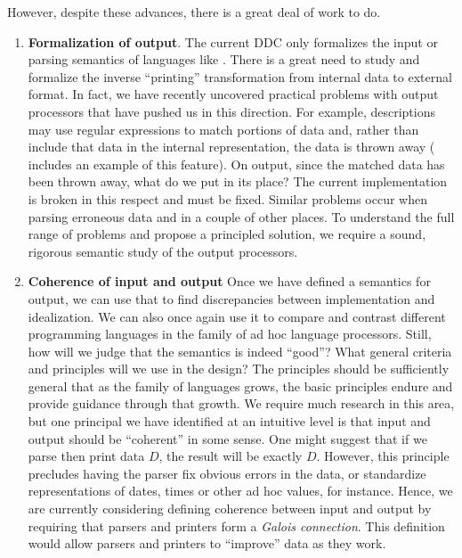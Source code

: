 However, despite these advances, there is a great deal of work to do.

\begin{enumerate}
\item {\bf Formalization of output}.  The current DDC only formalizes the
input or parsing semantics of languages like \pads.  There is
a great need to study and formalize the inverse ``printing'' transformation 
from internal data to external format.  In fact, we have recently
uncovered practical problems with output processors that have pushed us in 
this direction. For example, \pads{} descriptions may use regular expressions
to match portions of data and, rather than include that data in the
internal representation, the data is thrown away (
includes an example of this feature).  On output, since the matched
data has been thrown away, what do we put in its place?  The 
current implementation is broken in this respect and must be fixed.
Similar problems occur when parsing erroneous data and in a couple of other
places.  To understand the full range of problems and propose
a principled solution, we require a sound, rigorous semantic study
of the output processors.

\item {\bf Coherence of input and output}  Once we have defined a semantics
for output, we can use that to find discrepancies between implementation
and idealization.  We can also once again
use it to compare and contrast different programming languages
in the family of ad hoc language processors.  Still, 
how will we judge that the semantics is indeed ``good''?
What general criteria and principles will we use in the design?  The
principles should be sufficiently general that as the family of languages
grows, the basic principles endure and provide guidance through that 
growth.  We require much research in this area, but one principal
we have identified at an intuitive level is that input and output
should be ``coherent'' in some sense.  One might suggest that 
if we parse then print data $D$, the result will be exactly $D$.
However, this principle precludes having the parser fix obvious errors
in the data, or standardize representations of dates, times or other
ad hoc values, for instance.  Hence, we are currently considering
defining coherence between input and output
by requiring that parsers and printers form
a {\em Galois connection}.  This definition would allow parsers and printers to
``improve'' data as they work.  


\end{enumerate}
